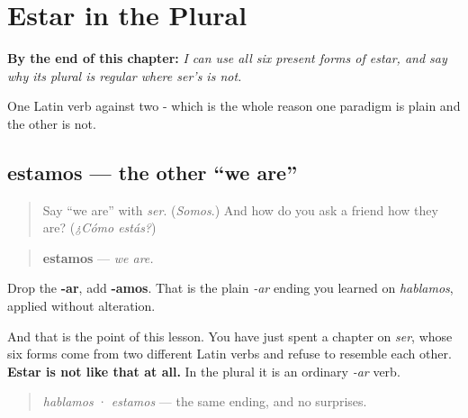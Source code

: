 
\chapter{Estar in the Plural}
\label{ch:spanish-estar-plural}

\begin{chapteropening}
\textbf{By the end of this chapter:} \emph{I can use all six present forms of estar, and say why its plural is regular where ser's is not.}

One Latin verb against two - which is the whole reason one paradigm is plain and the other is not.
\end{chapteropening}

\section[estamos]{estamos — the other \textquotedblleft{}we are\textquotedblright{}}

\label{lesson:ES-C09-estamos}



\begin{quote}
Say \textquotedblleft{}we are\textquotedblright{} with \emph{ser}. (\emph{Somos}.) And how do you ask a friend how they are? (\emph{¿Cómo estás?})
\end{quote}

\begin{grammarlens}[title={Grammar Lens: this one behaves}]
\begin{quote}
\textbf{estamos} — \emph{we are.}
\end{quote}

Drop the \textbf{-ar}, add \textbf{-amos}. That is the plain \emph{-ar} ending you learned on \emph{hablamos}, applied without alteration.

And that is the point of this lesson. You have just spent a chapter on \emph{ser}, whose six forms come from two different Latin verbs and refuse to resemble each other. \textbf{Estar is not like that at all.} In the plural it is an ordinary \emph{-ar} verb.

\begin{quote}
\emph{hablamos} · \emph{estamos} — the same ending, and no surprises.
\end{quote}
\end{grammarlens}

